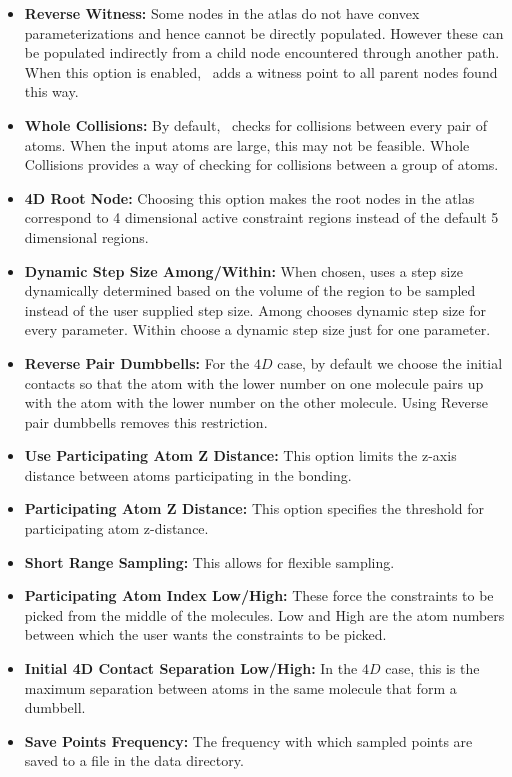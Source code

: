 \documentclass[10pt]{article}
\begin{document}
\begin{itemize}
\begin{itemize}
\item \textbf{Reverse Witness:} Some nodes in the atlas do not have convex
		parameterizations and hence cannot be  directly populated. However
		these can be populated indirectly from a child node encountered through
		another path. When this option is enabled, \EASAL~adds a witness point
		to all parent nodes found this way.  
\item \textbf{Whole Collisions:} By default, \EASAL~checks for collisions
		between every pair of atoms. When the input atoms are large, this may
		not be feasible. Whole Collisions provides a way of checking for
		collisions between a group of atoms.
\item \textbf{4D Root Node:} Choosing this option makes the root nodes in the
		atlas correspond to  4 dimensional active constraint regions instead of
		the default 5 dimensional regions.
\item \textbf{Dynamic Step Size Among/Within:} When chosen, uses a step size
		dynamically determined based on the volume of the region to be sampled
		instead of the user supplied step size. Among chooses dynamic step size
		for every parameter. Within choose a dynamic step size just for one
		parameter.
\item \textbf{Reverse Pair Dumbbells:} For the $4D$ case, by default we choose
		the initial contacts so that the atom with the lower number on one
		molecule pairs up with the atom with the lower number on the other
		molecule. Using Reverse pair dumbbells removes this restriction.
\item \textbf{Use Participating Atom Z Distance:} This option limits the z-axis
		distance between atoms participating in the bonding.
\item \textbf{Participating Atom Z Distance:} This option specifies the
		threshold for participating atom z-distance.
\item \textbf{Short Range Sampling:} This allows for flexible sampling.
\item \textbf{Participating Atom Index Low/High:} These force the constraints
		to be picked from the middle of the molecules. Low and High are the
		atom numbers between which the user wants the constraints to be picked.
\item \textbf{Initial 4D Contact Separation Low/High:} In the $4D$ case, this
		is the maximum separation between atoms in the same molecule that form
		a dumbbell.
\item \textbf{Save Points Frequency:} The frequency with which sampled points
		are saved to a file in the data directory.

\end{itemize}
\end{itemize}
\end{document}
